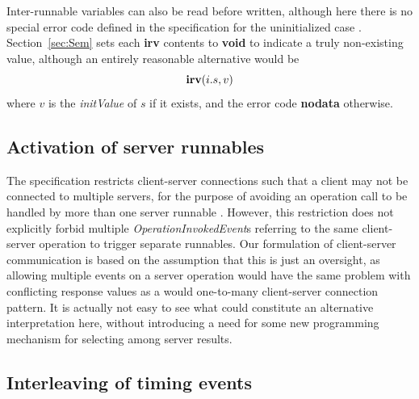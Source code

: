 \documentclass[10pt,conference]{IEEEtran}
\begin{document}
Inter-runnable variables can also be read before written, although here there is no special error code defined in the specification for the uninitialized case \cite[ch.~5.6.26]{AR:RTE}. Section~\ref{sec:Sem} sets each {\bf irv} contents to {\bf void} to indicate a truly non-existing value, although an entirely reasonable alternative would be
$$
  \textbf{irv}(i.s,v)
$$
where $v$ is the \emph{initValue} of $s$ if it exists, and the error code {\bf nodata} otherwise.


\subsection{Activation of server runnables}

The specification restricts client-server connections such that a client may not be connected to multiple servers, for the purpose of avoiding an operation call to be handled by more than one server runnable \cite[ch.~4.2.3]{AR:RTE}. However, this restriction does not explicitly forbid multiple \emph{Operation\-InvokedEvent}s referring to the same client-server operation to trigger separate runnables. Our formulation of client-server communication is based on the assumption that this is just an oversight, as allowing multiple events on a server operation would have the same problem with conflicting response values as a would one-to-many client-server connection pattern. It is actually not easy to see what could constitute an alternative interpretation here, without introducing a need for some new programming mechanism for selecting among server results.


\subsection{Interleaving of timing events}
\end{document}
